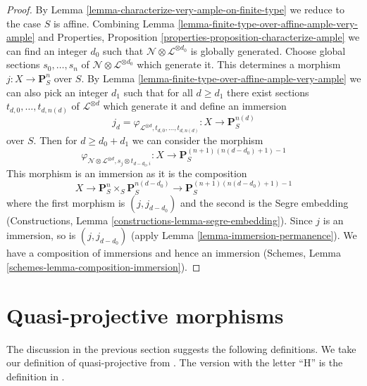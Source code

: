\begin{proof}
By Lemma \ref{lemma-characterize-very-ample-on-finite-type}
we reduce to the case $S$ is affine. Combining
Lemma \ref{lemma-finite-type-over-affine-ample-very-ample} and
Properties, Proposition \ref{properties-proposition-characterize-ample}
we can find an integer $d_0$ such that
$\mathcal{N} \otimes \mathcal{L}^{\otimes d_0}$
is globally generated. Choose global sections
$s_0, \ldots, s_n$ of $\mathcal{N} \otimes \mathcal{L}^{\otimes d_0}$
which generate it. This determines a morphism
$j : X \to \mathbf{P}^n_S$ over $S$. By
Lemma \ref{lemma-finite-type-over-affine-ample-very-ample}
we can also pick an integer $d_1$ such that for all $d \geq d_1$
there exist sections $t_{d, 0}, \ldots, t_{d, n(d)}$
of $\mathcal{L}^{\otimes d}$ which generate it and define
an immersion
$$
j_d = \varphi_{\mathcal{L}^{\otimes d}, t_{d, 0}, \ldots, t_{d, n(d)}} :
X
\longrightarrow
\mathbf{P}^{n(d)}_S
$$
over $S$. Then for $d \geq d_0 + d_1$ we can consider the
morphism
$$
\varphi_{\mathcal{N} \otimes \mathcal{L}^{\otimes d},
s_j \otimes t_{d - d_0, i}} :
X
\longrightarrow
\mathbf{P}^{(n + 1)(n(d - d_0) + 1) - 1}_S
$$
This morphism is an immersion as it is the composition
$$
X \to \mathbf{P}^n_S \times_S \mathbf{P}^{n(d - d_0)}_S
\to \mathbf{P}^{(n + 1)(n(d - d_0) + 1) - 1}_S
$$
where the first morphism is $(j, j_{d - d_0})$ and
the second is the Segre embedding
(Constructions, Lemma \ref{constructions-lemma-segre-embedding}).
Since $j$ is an immersion, so is $(j, j_{d - d_0})$
(apply Lemma \ref{lemma-immersion-permanence}). We have a composition of
immersions and hence an immersion
(Schemes, Lemma \ref{schemes-lemma-composition-immersion}).
\end{proof}










\section{Quasi-projective morphisms}
\label{section-quasi-projective}

\noindent
The discussion in the previous section suggests the following definitions.
We take our definition of quasi-projective from \cite{EGA}. The version
with the letter ``H'' is the definition in \cite{H}.

